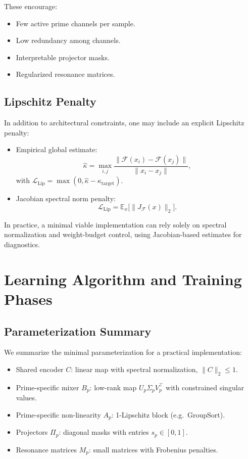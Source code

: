 \documentclass[11pt]{article}
\begin{document}
These encourage:
\begin{itemize}[leftmargin=*]
  \item Few active prime channels per sample.
  \item Low redundancy among channels.
  \item Interpretable projector masks.
  \item Regularized resonance matrices.
\end{itemize}

\subsection{Lipschitz Penalty}

In addition to architectural constraints, one may include an explicit Lipschitz penalty:
\begin{itemize}[leftmargin=*]
  \item Empirical global estimate:
  \[
    \hat{\kappa} = \max_{i,j} \frac{\|\mathcal{F}(x_i) - \mathcal{F}(x_j)\|}{\|x_i - x_j\|},
  \]
  with \(\mathcal{L}_{\mathrm{Lip}} = \max(0, \hat{\kappa} - \kappa_{\text{target}})\).
  \item Jacobian spectral norm penalty:
  \[
    \mathcal{L}_{\mathrm{Lip}} = \mathbb{E}_x\big[ \|J_{\mathcal{F}}(x)\|_2 \big].
  \]
\end{itemize}
In practice, a minimal viable implementation can rely solely on spectral normalization and weight-budget control, using Jacobian-based estimates for diagnostics.

\section{Learning Algorithm and Training Phases}

\subsection{Parameterization Summary}

We summarize the minimal parameterization for a practical implementation:

\begin{itemize}[leftmargin=*]
  \item Shared encoder \(C\): linear map with spectral normalization,
  \(\|C\|_2 \leq 1\).
  \item Prime-specific mixer \(B_p\): low-rank map \(U_p \Sigma_p V_p^\top\) with constrained singular values.
  \item Prime-specific non-linearity \(A_p\): 1-Lipschitz block (e.g.\ GroupSort).
  \item Projectors \(\Pi_p\): diagonal masks with entries \(s_p \in [0,1]\).
  \item Resonance matrices \(M_p\): small matrices with Frobenius penalties.
\end{itemize}
\end{document}
